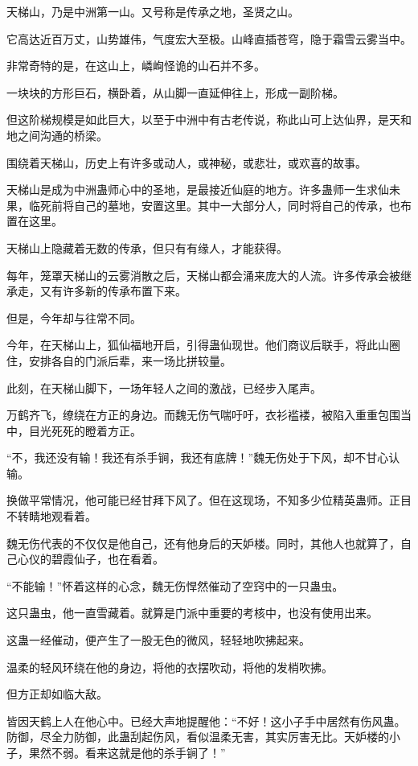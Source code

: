 
\begin{this_body}

天梯山，乃是中洲第一山。又号称是传承之地，圣贤之山。

它高达近百万丈，山势雄伟，气度宏大至极。山峰直插苍穹，隐于霜雪云雾当中。

非常奇特的是，在这山上，嶙峋怪诡的山石并不多。

一块块的方形巨石，横卧着，从山脚一直延伸往上，形成一副阶梯。

但这阶梯规模是如此巨大，以至于中洲中有古老传说，称此山可上达仙界，是天和地之间沟通的桥梁。

围绕着天梯山，历史上有许多或动人，或神秘，或悲壮，或欢喜的故事。

天梯山是成为中洲蛊师心中的圣地，是最接近仙庭的地方。许多蛊师一生求仙未果，临死前将自己的墓地，安置这里。其中一大部分人，同时将自己的传承，也布置在这里。

天梯山上隐藏着无数的传承，但只有有缘人，才能获得。

每年，笼罩天梯山的云雾消散之后，天梯山都会涌来庞大的人流。许多传承会被继承走，又有许多新的传承布置下来。

但是，今年却与往常不同。

今年，在天梯山上，狐仙福地开启，引得蛊仙现世。他们商议后联手，将此山圈住，安排各自的门派后辈，来一场比拼较量。

此刻，在天梯山脚下，一场年轻人之间的激战，已经步入尾声。

万鹤齐飞，缭绕在方正的身边。而魏无伤气喘吁吁，衣衫褴褛，被陷入重重包围当中，目光死死的瞪着方正。

“不，我还没有输！我还有杀手锏，我还有底牌！”魏无伤处于下风，却不甘心认输。

换做平常情况，他可能已经甘拜下风了。但在这现场，不知多少位精英蛊师。正目不转睛地观看着。

魏无伤代表的不仅仅是他自己，还有他身后的天妒楼。同时，其他人也就算了，自己心仪的碧霞仙子，也在看着。

“不能输！”怀着这样的心念，魏无伤悍然催动了空窍中的一只蛊虫。

这只蛊虫，他一直雪藏着。就算是门派中重要的考核中，也没有使用出来。

这蛊一经催动，便产生了一股无色的微风，轻轻地吹拂起来。

温柔的轻风环绕在他的身边，将他的衣摆吹动，将他的发梢吹拂。

但方正却如临大敌。

皆因天鹤上人在他心中。已经大声地提醒他：“不好！这小子手中居然有伤风蛊。防御，尽全力防御，此蛊刮起伤风，看似温柔无害，其实厉害无比。天妒楼的小子，果然不弱。看来这就是他的杀手锏了！”


\end{this_body}
